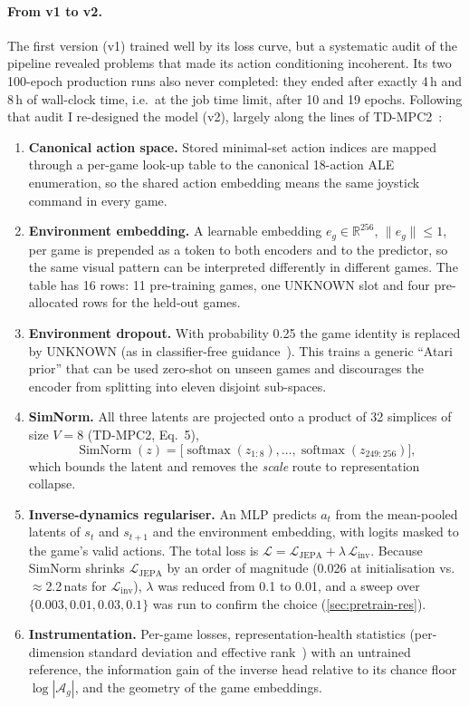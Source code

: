 \documentclass[runningheads]{llncs}
\newcommand{\R}{\mathbb{R}}
\begin{document}
\paragraph{From v1 to v2.}
The first version (v1) trained well by its loss curve, but a systematic audit of the
pipeline revealed problems that made its action conditioning incoherent. Its two
100-epoch production runs also never completed: they ended after exactly 4\,h and 8\,h
of wall-clock time, i.e.\ at the job time limit, after 10 and 19 epochs. Following that
audit I re-designed the model (v2), largely along the lines of
TD-MPC2~\cite{hansen2024tdmpc2}:
\begin{enumerate}
  \item \textbf{Canonical action space.} Stored minimal-set action indices are
  mapped through a per-game look-up table to the canonical 18-action ALE enumeration, so
  the shared action embedding means the same joystick command in every game.
  \item \textbf{Environment embedding.} A learnable embedding $e_g\in\R^{256}$,
  $\|e_g\|\le1$, per game is prepended as a token to both encoders and to the
  predictor, so the same visual pattern can be interpreted differently in different
  games. The table has 16 rows: 11 pre-training games, one UNKNOWN slot and four
  pre-allocated rows for the held-out games.
  \item \textbf{Environment dropout.} With probability 0.25 the game identity is replaced
  by UNKNOWN (as in classifier-free guidance~\cite{ho2021cfg}). This trains a generic
  ``Atari prior'' that can be used zero-shot on unseen games and discourages the encoder
  from splitting into eleven disjoint sub-spaces.
  \item \textbf{SimNorm.} All three latents are projected onto a product of 32 simplices
  of size $V=8$ (TD-MPC2, Eq.~5),
  \[\operatorname{SimNorm}(z)=\big[\operatorname{softmax}(z_{1:8}),\dots,\operatorname{softmax}(z_{249:256})\big],\]
  which bounds the latent and removes the \emph{scale} route to representation collapse.
  \item \textbf{Inverse-dynamics regulariser.} An MLP predicts $a_t$ from the mean-pooled
  latents of $s_t$ and $s_{t+1}$ and the environment embedding, with logits masked to the
  game's valid actions. The total loss is $\mathcal{L}=\mathcal{L}_{\text{JEPA}}+\lambda\,\mathcal{L}_{\text{inv}}$.
  Because SimNorm shrinks $\mathcal{L}_{\text{JEPA}}$ by an order of magnitude
  (0.026 at initialisation vs.\ $\approx$2.2\,nats for $\mathcal{L}_{\text{inv}}$), $\lambda$
  was reduced from 0.1 to 0.01, and a sweep over $\{0.003,0.01,0.03,0.1\}$ was run to
  confirm the choice (\cref{sec:pretrain-res}).
  \item \textbf{Instrumentation.} Per-game losses, representation-health statistics
  (per-dimension standard deviation and effective rank~\cite{roy2007effective}) with an
  untrained reference, the information gain of the inverse head relative to its chance
  floor $\log|\mathcal{A}_g|$, and the geometry of the game embeddings.
\end{enumerate}
\end{document}
